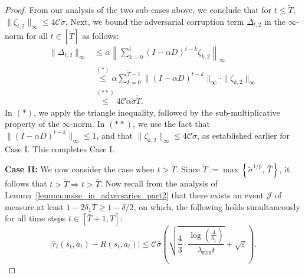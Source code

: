 \documentclass{article}
\newcommand{\mc}{\mathcal}
\begin{document}
\begin{proof}
From our analysis of the two sub-cases above, we conclude that for $t \leq \tilde{T}$, \(\| \zeta_{t,2} \|_\infty \leq 4 \mc{C} \tilde{\sigma} \).  
Next, we bound the adversarial corruption term \(\Delta_{t,2}\) in the \(\infty\)-norm for all \(t \in [\tilde{T}]\) as follows:
\begin{equation}\label{eqn:case1,lemma13}
\begin{aligned}
\|\Delta_{t,2}\|_\infty 
&\leq \alpha \left\| \sum_{k=0}^t (I - \alpha D)^{t-k} \zeta_{k,2} \right\|_\infty \\
&\overset{(*)}{\leq} \alpha \sum_{k=0}^{\tilde{T}-1} \| (I - \alpha D)^{t-k} \|_\infty \cdot \| \zeta_{k,2} \|_\infty \\
&\overset{(**)}{\leq} 4\mc{C} \alpha \tilde{\sigma} \tilde{T}.
\end{aligned}
\end{equation}
In \((*)\), we apply the triangle inequality, followed by the sub-multiplicative property of the \(\infty\)-norm. In \((**)\), we use the fact that \(\| (I - \alpha D)^{t-k} \|_\infty \leq 1\), and that \(\| \zeta_{k,2} \|_\infty \leq 4 \mathcal{C} \tilde{\sigma}\), as established earlier for Case I. This completes Case I. 


\textbf{Case II:} We now consider the case when $t > \tilde{T}$. Since \(\tilde{T} := \max\left\{ \tilde{\sigma}^{1/p},\, \bar{T} \right\}\), it follows that \(t > \tilde{T} \Rightarrow t > \bar{T}\). Now recall from the analysis of Lemma~\ref{lemma:noise_in_adversaries_part2} that there exists an event \(\mathcal{J}\) of measure at least $1- 2\delta_1 T \geq 1- \delta/2$, on which, the following holds 
simultaneously for all time steps \(t \in [\bar{T}+1, T]\): 
\begin{equation}\label{eqn:OG_bnd}
        \left| \bar{r}_t(s_t, a_t) - R(s_t, a_t) \right| 
        \leq \mc{C} \bar{\sigma} \left( 
            \sqrt{ \frac{4}{3} \cdot \frac{ \log\left( \frac{4}{\delta_1} \right) }{ \lambda_{\texttt{min}} t } } 
            + \sqrt{\varepsilon} 
        \right). 
\end{equation}


\end{proof}
\end{document}
